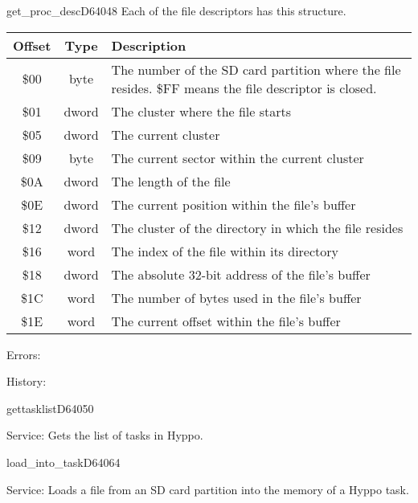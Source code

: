 \begin{hyppotrap}{get\_proc\_desc}{D640}{48}
  Each of the file descriptors has this structure.
  {\setlength{\tabcolsep}{2mm}
  \begin{tabular}{|c|c|p{6.9cm}|}
  \hline
  \textbf{Offset} & \textbf{Type} & \textbf{Description}
  \\\hline
  \$00 & byte  & The number of the SD card partition where the file resides.
                 \$FF means the file descriptor is closed.
  \\\hline
  \$01 & dword & The cluster where the file starts
  \\\hline
  \$05 & dword & The current cluster
  \\\hline
  \$09 & byte  & The current sector within the current cluster
  \\\hline
  \$0A & dword & The length of the file
  \\\hline
  \$0E & dword & The current position within the file's buffer
  \\\hline
  \$12 & dword & The cluster of the directory in which the file resides
  \\\hline
  \$16 & word  & The index of the file within its directory
  \\\hline
  \$18 & dword & The absolute 32-bit address of the file's buffer
  \\\hline
  \$1C & word  & The number of bytes used in the file's buffer
  \\\hline
  \$1E & word  & The current offset within the file's buffer
  \\\hline
  \end{tabular}
  }
\item [Errors:]
\item [History:]
\end{hyppotrap}


\newpage
\begin{hyppotrap}{gettasklist}{D640}{50}
\item [Service:]
  Gets the list of tasks in Hyppo.
\notimplemented
\end{hyppotrap}


\begin{hyppotrap}{load\_into\_task}{D640}{64}
\item [Service:]
  Loads a file from an SD card partition into the memory of a Hyppo task.
\notimplemented
\end{hyppotrap}


